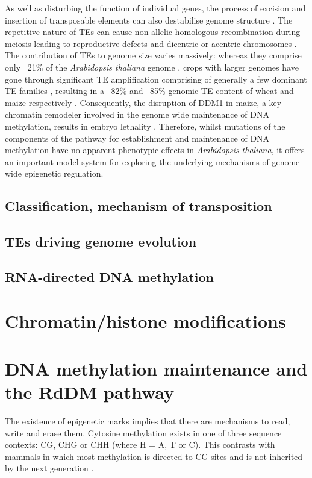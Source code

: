 As well as disturbing the function of individual genes, the process of excision and insertion of transposable elements can also destabilise genome structure \citep{RN103}. The repetitive nature of TEs can cause non-allelic homologous recombination during meiosis leading to reproductive defects and dicentric or acentric chromosomes \citep{RN108}. The contribution of TEs to genome size varies massively: whereas they comprise only ~21\% of the \textit{Arabidopsis thaliana} genome \citep{RN109},  crops with larger genomes have gone through significant TE amplification comprising of generally a few dominant TE families \citep{RN110,RN113}, resulting in a ~82\% and ~85\% genomic TE content of wheat and maize respectively \citep{RN110,RN111}. Consequently, the disruption of DDM1 in maize, a key chromatin remodeler involved in the genome wide maintenance of DNA methylation, results in embryo lethality \citep{RN112}. Therefore, whilst mutations of the components of the pathway for establishment and maintenance of DNA methylation have no apparent phenotypic effects in \textit{Arabidopsis thaliana}, it offers an important model system for exploring the underlying mechanisms of genome-wide epigenetic regulation.

\subsection{Classification, mechanism of transposition}
\subsection{TEs driving genome evolution}
\subsection{RNA-directed DNA methylation}

\section{Chromatin/histone modifications} %

\section{DNA methylation maintenance and the RdDM pathway} %

The existence of epigenetic marks implies that there are mechanisms to read, write and erase them. Cytosine methylation exists in one of three sequence contexts: CG, CHG or CHH (where H = A, T or C).  This contrasts with mammals in  which most methylation is directed to CG sites  and is not inherited by the next generation \citep{RN228}. 

